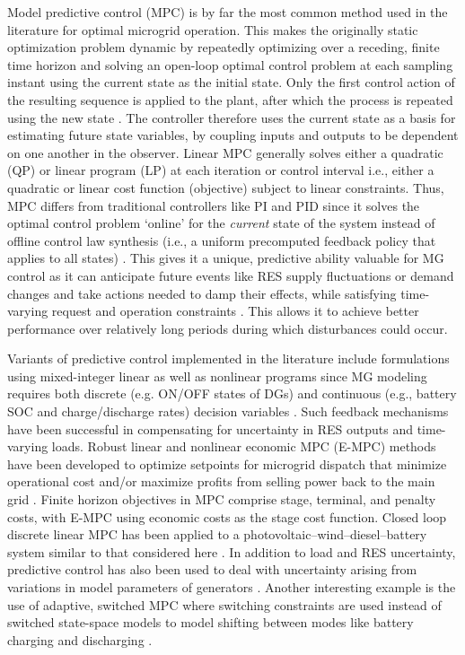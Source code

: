 \documentclass[final,3p,times]{elsarticle}
\begin{document}
Model predictive control (MPC) is by far the most common method used in the literature for optimal microgrid operation. This makes the originally static optimization problem dynamic by repeatedly optimizing over a receding, finite time horizon and solving an open-loop optimal control problem at each sampling instant using the current state as the initial state. Only the first control action of the resulting sequence is applied to the plant, after which the process is repeated using the new state \cite{mpc}. The controller therefore uses the current state as a basis for estimating future state variables, by coupling inputs and outputs to be dependent on one another in the observer. Linear MPC generally solves either a quadratic (QP) or linear program (LP) at each iteration or control interval i.e., either a quadratic or linear cost function (objective) subject to linear constraints. Thus, MPC differs from traditional controllers like PI and PID since it solves the optimal control problem `online' for the \textit{current} state of the system instead of offline control law synthesis (i.e., a uniform precomputed feedback policy that applies to all states) \cite{mpc}. This gives it a unique, predictive ability valuable for MG control as it can anticipate future events like RES supply fluctuations or demand changes and take actions needed to damp their effects, while satisfying time-varying request and operation constraints \cite{parisio2014}. This allows it to achieve better performance over relatively long periods during which disturbances could occur.

Variants of predictive control implemented in the literature include formulations using mixed-integer linear as well as nonlinear programs since MG modeling requires both discrete (e.g. ON/OFF states of DGs) and continuous (e.g., battery SOC and charge/discharge rates) decision variables \cite{parisio2013, parisio2014}. Such feedback mechanisms have been successful in compensating for uncertainty in RES outputs and time-varying loads. Robust linear and nonlinear economic MPC (E-MPC) methods have been developed to optimize setpoints for microgrid dispatch that minimize operational cost \cite{zachar2016} and/or maximize profits from selling power back to the main grid \cite{pereira2017}. Finite horizon objectives in MPC comprise stage, terminal, and penalty costs, with E-MPC using economic costs as the stage cost function. Closed loop discrete linear MPC has been applied to a photovoltaic--wind--diesel--battery system similar to that considered here \cite{tazvinga2014}. In addition to load and RES uncertainty, predictive control has also been used to deal with uncertainty arising from variations in model parameters of generators \cite{prodan2014}. Another interesting example is the use of adaptive, switched MPC where switching constraints are used instead of switched state-space models to model shifting between modes like battery charging and discharging \cite{zhu2015}.
\end{document}

